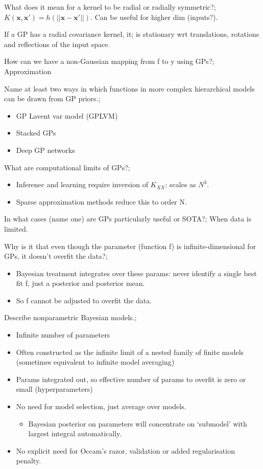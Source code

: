 \documentclass{article}
\begin{document}
What does it mean for a kernel to be radial or radially symmetric?; $K(\mathbf{x, x'})=h(||\mathbf{x-x'}||)$. Can be useful for higher dim (inputs?).

If a GP has a radial covariance kernel, it; is stationary wrt translations, rotations and reflections of the input space.

How can we have a non-Gaussian mapping from f to y using GPs?; Approximation

Name at least two ways in which functions in more complex hierarchical models can be drawn from GP priors.; \begin{itemize} \item GP Lavent var model (GPLVM) \item Stacked GPs \item Deep GP networks \end{itemize}

What are computational limits of GPs?; \begin{itemize} \item Inferenec and learning require inversion of $K_{XX}$: scales as $N^3$.  \item Sparse approximation methods reduce this to order N.  \end{itemize}

In what cases (name one) are GPs particularly useful or SOTA?; When data is limited.

Why is it that even though the parameter (function f) is infinite-dimensional for GPs, it doesn't overfit the data?; \begin{itemize} \item Bayesian treatment integrates over these params: never identify a single best fit f, just a posterior and posterior mean.  \item So f cannot be adjusted to overfit the data.  \end{itemize}

Describe nonparametric Bayesian models.; \begin{itemize} \item Infinite number of parameters \item Often constructed as the infinite limit of a nested family of finite models (sometimes equivalent to infinite model averaging) \item Params integrated out, so effective number of params to overfit is zero or small (hyperparameters) \item No need for model selection, just average over models. \begin{itemize} \item Bayesian posterior on parameters will concentrate on `submodel' with largest integral automatically.  \end{itemize} \item No explicit need for Occam's razor, validation or added regularisation penalty.  \end{itemize}
\end{document}
